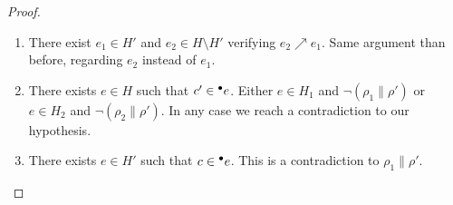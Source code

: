 \documentclass[12pt,a4paper]{article}
\begin{document}
\begin{proof}
\begin{enumerate}
\item There exist $e_1 \in H'$ and $e_2 \in H \setminus H'$ verifying $e_2
\nearrow e_1$.  Same argument than before, regarding $e_2$ instead of $e_1$.

\item There exists $e \in H$ such that $c' \in {}^\bullet e$.  Either $e \in H_1$ and
$\lnot (\rho_1 \parallel \rho')$ or $e \in H_2$ and $\lnot (\rho_2 \parallel
\rho')$.  In any case we reach a contradiction to our hypothesis.

\item There exists $e \in H'$ such that $c \in {}^\bullet e$.  This is a
contradiction to $\rho_1 \parallel \rho'$.
\end{enumerate}
\end{proof}
\end{document}
